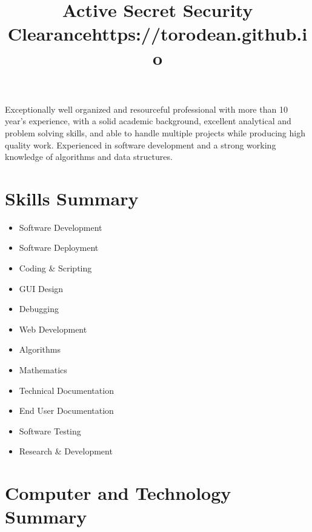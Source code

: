 \documentclass[11pt,a4paper,sans]{moderncv} %
\title{Active Secret Security Clearance\newline\newline https://torodean.github.io}
\begin{document}
\makecvtitle %


Exceptionally well organized and resourceful professional with more than 10 year’s experience, with a solid academic background, excellent analytical and problem solving skills, and able to handle multiple projects while producing high quality work. Experienced in software development and a strong working knowledge of algorithms and data structures.	


\section{Skills Summary}

\begin{multicols}{3}
	\begin{itemize}
	\item Software Development
	\item Software Deployment
	\item Coding \& Scripting
	\item GUI Design
	\item Debugging
	\item Web Development
	\item Algorithms
	\item Mathematics
	\item Technical Documentation
	\item End User Documentation
	\item Software Testing
	\item Research \& Development
	\end{itemize}
\end{multicols}


\section{Computer and Technology Summary}
\end{document}
